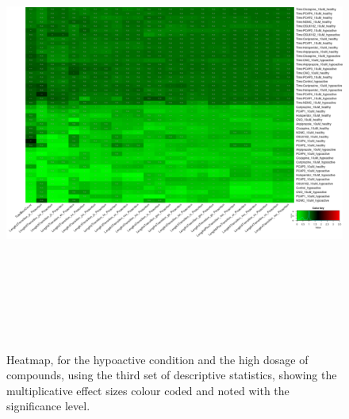 \documentclass[a4paper,12pt]{article}
\begin{document}
\begin{figure}[h!]
\begin{center}
\includegraphics[width=16cm,height=15cm]{DarkApoLow_heatmap_10_microM_DarkApoLow_B1MAP.png}
\caption{Heatmap, for the hypoactive condition and the high dosage of compounds, using the third set of descriptive statistics, showing the multiplicative effect sizes colour coded and noted with the significance level.}
\end{center}
\end{figure}
\newpage
\end{document}

